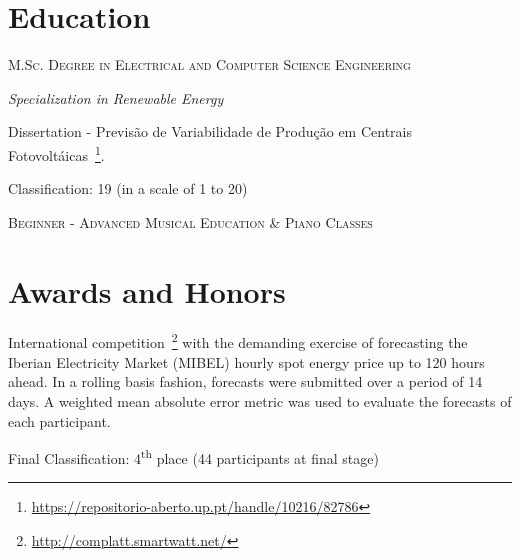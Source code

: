 \documentclass{mycv}
\begin{document}
\section{Education}{

\textsc{M.Sc. Degree in Electrical and Computer Science Engineering}

\textit{Specialization in Renewable Energy}

\begin{myitemize}
	\item Dissertation - Previs\~{a}o de Variabilidade de Produ\c{c}\~{a}o em Centrais Fotovolt\'{a}icas~\footnote{\url{https://repositorio-aberto.up.pt/handle/10216/82786}}.
	\begin{myitemize}
		\item Classification: 19 (in a scale of 1 to 20)
	\end{myitemize}
\end{myitemize}



\textsc{Beginner - Advanced Musical Education \& Piano Classes }





\section{Awards and Honors}



International competition~\footnote{\url{http://complatt.smartwatt.net/}} with the demanding exercise of forecasting the Iberian Electricity Market (MIBEL) hourly spot energy price up to 120 hours ahead. In a rolling basis fashion, forecasts were submitted over a period of 14 days. A weighted mean absolute error metric was used to evaluate the forecasts of each participant.

\begin{myitemize}
	\item Final Classification: 4\textsuperscript{th} place (44 participants at final stage)
\end{myitemize}

}
\end{document}
